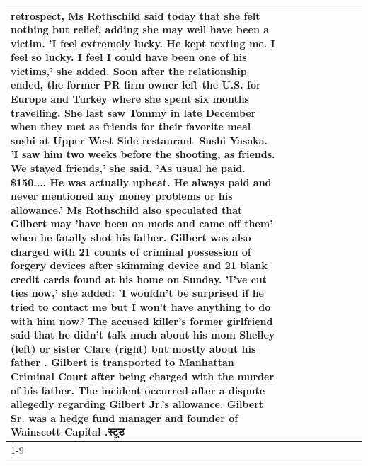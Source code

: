 \begin{table}[H]
\begin{tabular}{lllrlllll}
retrospect, Ms Rothschild said today that she felt nothing but relief, adding she may well have been a victim. 'I feel extremely lucky. He kept texting me. I feel so lucky. I feel I could have been one of his victims,' she added. Soon after the relationship ended, the former PR firm owner left the U.S. for Europe and Turkey where she spent six months  travelling. She last saw Tommy in late December when they met as friends for their favorite meal sushi at Upper West Side restaurant Sushi Yasaka. 'I saw him two weeks before the shooting, as friends. We stayed friends,' she said. 'As usual he paid. \$150.... He was actually upbeat. He always paid and never mentioned any money problems or his allowance.' Ms Rothschild also speculated that Gilbert may 'have been on meds and came off them' when he fatally shot his father. Gilbert was also charged with 21 counts of criminal possession of forgery devices after skimming device and 21 blank credit cards found at his home on Sunday. 'I've cut ties now,' she added: 'I wouldn’t be surprised if he tried to contact me but I won’t have anything to do with him now.' The accused killer's former girlfriend said that he didn't talk much about his mom Shelley (left) or sister Clare (right) but mostly about his father . Gilbert is transported to Manhattan Criminal Court  after being charged with the murder of his father. The incident occurred after a dispute allegedly regarding Gilbert Jr.'s allowance. Gilbert Sr. was a hedge fund manager and founder of Wainscott Capital .स्टूड \\
\cline{1-9}

\end{tabular}
\end{table}
